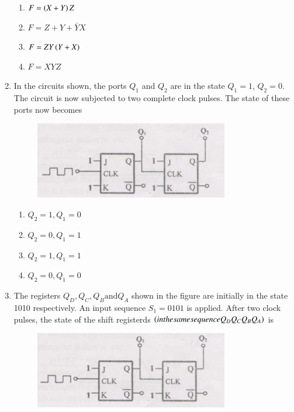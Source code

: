 \documentclass[journal]{IEEEtran}
\numberwithin{equation}{enumi}
\numberwithin{figure}{enumi}
\begin{document}
\begin{enumerate}
\begin{figure}[H]
                        \caption{}
                        \label{graph}
                \end{figure}
		\begin{enumerate}
			\item $F = \left(X + Y\right)Z$
			\item $F = Z + Y + \bar{Y}X$
			\item $F = ZY\left(Y + X\right)$
			\item $F = XYZ$
		\end{enumerate}
	\item In the circuits shown, the ports $Q_1$ and $Q_2$ are in the state $Q_1 = 1$, $Q_2 = 0$. The circuit is now subjected to two complete clock pulses. The state of these ports now becomes
		\begin{figure}[H]
                        \centering
                        \includegraphics[width=0.4\linewidth]{figs/fig4.png}
                        \caption{}
                        \label{graph}
                \end{figure}
		\begin{enumerate}
			\item $Q_2 = 1, Q_1 = 0$
			\item $Q_2 = 0, Q_1 = 1$
			\item $Q_2 = 1, Q_1 = 1$
			\item $Q_2 = 0, Q_1 = 0$
		\end{enumerate}
	\item The registers $Q_D, Q_C, Q_B \text{and} Q_A$ shown in the figure are initially in the state 1010 respectively. An input sequence $S_1 = 0101$ is applied. After two clock pulses, the state of the shift registerds $\left(in the same sequence Q_DQ_CQ_BQ_A\right)$ is
		\begin{figure}[H]
                        \centering
                        \includegraphics[width=0.4\linewidth]{figs/fig5.png}
                        \caption{}
                        \label{graph}
		\end{figure}

\end{enumerate}
\end{document}

